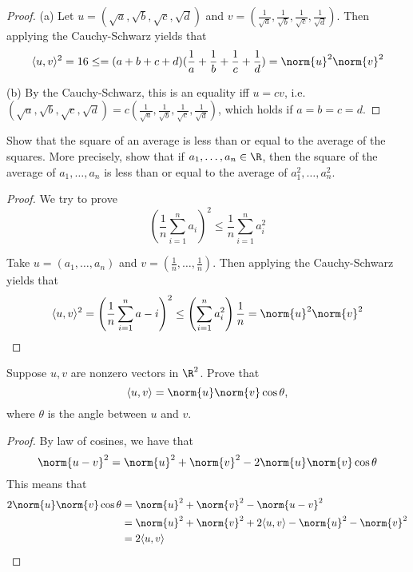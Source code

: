 \documentclass{extarticle}
\begin{document}
\begin{proof}
(a) Let \(u = (\sqrt{a},\sqrt{b},\sqrt{c},\sqrt{d})\) and \(v =
(\frac{1}{\sqrt{a}}, \frac{1}{\sqrt{b}}, \frac{1}{\sqrt{c}}, \frac{1}{\sqrt{d}})\). Then applying the
Cauchy-Schwarz yields that
\begin{align*}
    \langle u,v \rangle^2 = 16 \leq = (a+b+c+d)(\frac{1}{a}+\frac{1}{b}+\frac{1}{c}+\frac{1}{d})= \norm{u}^2 \norm{v}^2
\end{align*}

(b) By the Cauchy-Schwarz, this is an equality iff \(u = cv\), i.e. \((\sqrt{a}, \sqrt{b}, \sqrt{c}, \sqrt{d})
= c (\frac{1}{\sqrt{a}}, \frac{1}{\sqrt{b}}, \frac{1}{\sqrt{c}}, \frac{1}{\sqrt{d}})\), which holds
if \(a=b=c=d\).
\end{proof}

\begin{problem}{13}
    Show that the square of an average is less than or equal to the average of the squares. More
    precisely, show that if \(a_1, \ldots, a_n \in \R\), then the square of the average of
    \(a_1, \ldots, a_n\) is less than or equal to the average of \(a_1^2, \ldots, a_n^2\).
\end{problem}

\begin{proof}
We try to prove
\[\left(\frac{1}{n} \sum_{i=1}^{n} a_i \right)^2 \leq \frac{1}{n} \sum_{i=1}^{n}a_i^2\]

Take \(u = (a_1, \ldots, a_n)\) and \(v = (\frac{1}{n}, \ldots, \frac{1}{n})\). Then applying the Cauchy-Schwarz yields
that
\begin{align*}
    \langle u,v \rangle^2
    = \left(\frac{1}{n} \sum_{i=1}^{n} a-i \right)^2
    \leq \left(\sum_{i=1}^{n} a_i^2 \right)\frac{1}{n} = \norm{u}^2 \norm{v}^2
\end{align*}
\end{proof}

\begin{problem}{15}
    Suppose \(u, v\) are nonzero vectors in \(\R^2\). Prove that
    \[\langle u,v \rangle = \norm{u} \norm{v} \cos \theta ,\]
    where \(\theta\) is the angle between \(u\) and \(v\).
\end{problem}

\begin{proof}
By law of cosines, we have that
\[\norm{u - v}^2 = \norm{u}^2 + \norm{v}^2 - 2 \norm{u}\norm{v}\cos \theta\]
This means that
\begin{align*}
    2 \norm{u} \norm{v}\cos \theta
    &= \norm{u}^2 + \norm{v}^2 - \norm{u - v}^2 \\
    &= \norm{u}^2 + \norm{v}^2 + 2 \langle u,v \rangle - \norm{u}^2 - \norm{v}^2 \\
    &= 2 \langle u,v \rangle
\end{align*}
\end{proof}
\end{document}
